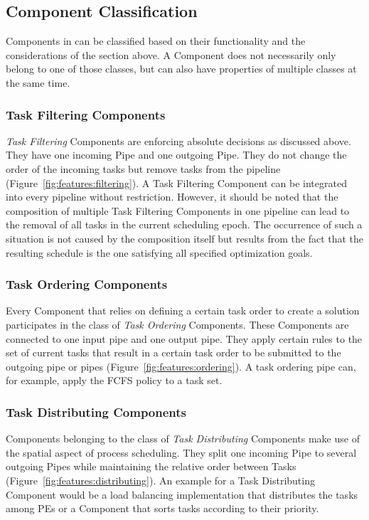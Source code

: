 \subsection{Component Classification}%
\label{sec:prop:composition:classification}

Components in \cobas{} can be classified based on their functionality and the considerations of the section above. A Component does not necessarily only belong to one of those classes, but can also have properties of multiple classes at the same time.

\subsubsection{Task Filtering Components}

\emph{Task Filtering} Components are enforcing absolute decisions as discussed above. They have one incoming Pipe and one outgoing Pipe. They do not change the order of the incoming tasks but remove tasks from the pipeline (Figure~\ref{fig:features:filtering}). A Task Filtering Component can be integrated into every pipeline without restriction. However, it should be noted that the composition of multiple Task Filtering Components in one pipeline can lead to the removal of all tasks in the current scheduling epoch. The occurrence of such a situation is not caused by the composition itself but results from the fact that the resulting schedule is the one satisfying all specified optimization goals.

\subsubsection{Task Ordering Components}

Every Component that relies on defining a certain task order to create a solution participates in the class of \emph{Task Ordering} Components. These Components are connected to one input pipe and one output pipe. They apply certain rules to the set of current tasks that result in a certain task order to be submitted to the outgoing pipe or pipes (Figure~\ref{fig:features:ordering}). A task ordering pipe can, for example, apply the \ac{FCFS} policy to a task set.

\subsubsection{Task Distributing Components}

Components belonging to the class of \emph{Task Distributing} Components make use of the spatial aspect of process scheduling. They split one incoming Pipe to several outgoing Pipes while maintaining the relative order between Tasks (Figure~\ref{fig:features:distributing}). An example for a Task Distributing Component would be a load balancing implementation that distributes the tasks among \acp{PE} or a Component that sorts tasks according to their priority.

